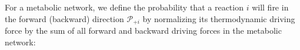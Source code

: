 For a metabolic network, we define the probability that a reaction $i$ will fire in the forward (backward)  direction ${\mathcal P_{+i}}$  by normalizing its thermodynamic driving force by the sum of all forward and backward driving forces in the metabolic network:
